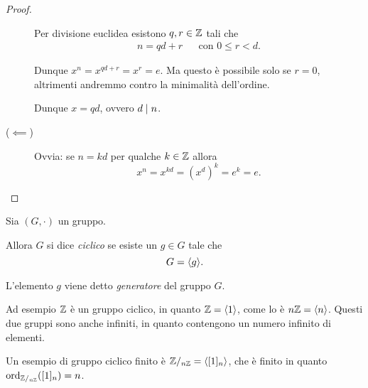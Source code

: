 \begin{proof}
\begin{description}
        Per divisione euclidea esistono $q, r \in \Z$ tali che \begin{align*}
            n = qd + r &&\text{con } 0 \leq r < d.
        \end{align*}

        Dunque $x^n = x^{qd+r} = x^r = e$. Ma questo è possibile solo se $r = 0$, altrimenti andremmo contro la minimalità dell'ordine.
        
        Dunque $x = qd$, ovvero $d \divides n$.
        \item[($\impliedby$)] Ovvia: se $n = kd$ per qualche $k \in \Z$ allora \[
            x^n = x^{kd} = (x^d)^k = e^k = e.    
        \]
    \end{description}
\end{proof}

\begin{definition}
    \label{def:grp_ciclico}
    Sia $(G, \cdot)$ un gruppo. 
    
    Allora $G$ si dice \emph{ciclico} se esiste un $g \in G$ tale che \[
        G = \gen{g}.    
    \]

    L'elemento $g$ viene detto \emph{generatore} del gruppo $G$.
\end{definition}

Ad esempio $\Z$ è un gruppo ciclico, in quanto $\Z = \gen{1}$, come lo è $n\Z = \gen n$. Questi due gruppi sono anche infiniti, in quanto contengono un numero infinito di elementi.

Un esempio di gruppo ciclico finito è $\Zmod{n} = \gen{[1]_n}$, che è finito in quanto $\ord[\Zmod{n}]{[1]_n} = n$.

